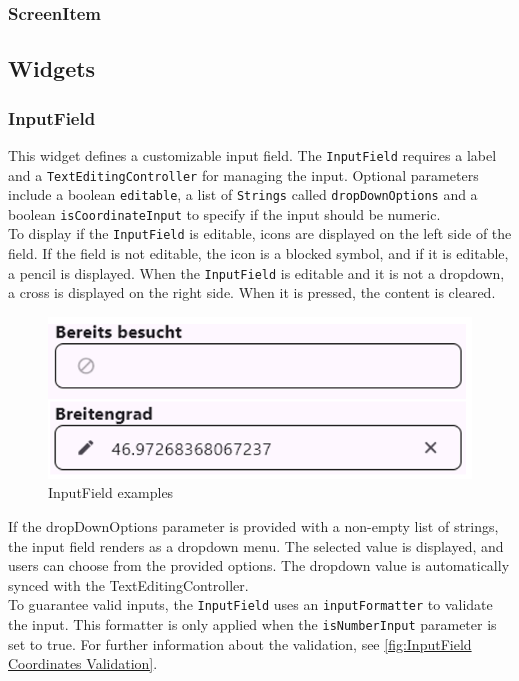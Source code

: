 \subsubsection{ScreenItem}

\subsection{Widgets}

\subsubsection{InputField}
\label{fig:InputField} 
This widget defines a customizable input field. The \texttt{InputField} requires a label and a \texttt{TextEditingController} for managing the input. Optional parameters include a boolean \texttt{editable}, a list of \texttt{Strings} called \texttt{dropDownOptions} and a boolean \texttt{isCoordinateInput} to specify if the input should be numeric.\\

To display if the \texttt{InputField} is editable, icons are displayed on the left side of the field. If the field is not editable, the icon is a blocked symbol, and if it is editable, a pencil is displayed. When the \texttt{InputField} is editable and it is not a dropdown, a cross is displayed on the right side. When it is pressed, the content is cleared.\\

\begin{figure}[H]
    \centering
    \includegraphics[width=0.4\linewidth]{images/AdminPanel/InputFieldExamples.png}
    \caption{InputField examples}
\end{figure}

If the dropDownOptions parameter is provided with a non-empty list of strings, the input field renders as a dropdown menu. The selected value is displayed, and users can choose from the provided options. The dropdown value is automatically synced with the TextEditingController.\\

To guarantee valid inputs, the \texttt{InputField} uses an \texttt{inputFormatter} to validate the input. This formatter is only applied when the \texttt{isNumberInput} parameter is set to true. For further information about the validation, see \ref{fig:InputField Coordinates Validation}.


